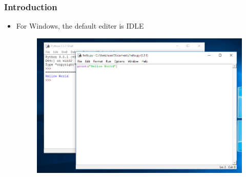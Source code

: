
\begin{frame}
\frametitle{Introduction}

\begin{itemize}
\item For Windows, the default editer is IDLE
\begin{figure}
\includegraphics[width=0.8\linewidth]{IDLE.png}
\end{figure}
\end{itemize}

\end{frame}
